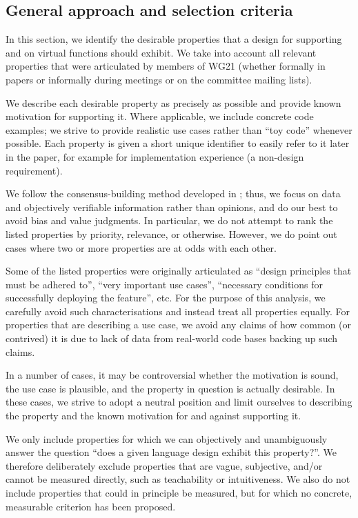 
\subsection{General approach and selection criteria}

In this section, we identify the desirable properties that a design for supporting  and  on virtual functions should exhibit. We take into account all relevant properties that were articulated by members of WG21 (whether formally in papers or informally during meetings or on the committee mailing lists).

We describe each desirable property as precisely as possible and provide known motivation for supporting it. Where applicable, we include concrete code examples; we strive to provide realistic use cases rather than ``toy code'' whenever possible. Each property is given a short unique identifier to easily refer to it later in the paper, for example  for implementation experience (a non-design requirement). 

We follow the consensus-building method developed in \cite{P3684R0}; thus, we focus on data and objectively verifiable information rather than opinions, and do our best to avoid bias and value judgments. In particular, we do not attempt to rank the listed properties by priority, relevance, or otherwise. However, we do point out cases where two or more properties are at odds with each other.

Some of the listed properties were originally articulated as ``design principles that must be adhered to'',  ``very important use cases'', ``necessary conditions for successfully deploying the feature'', etc. For the purpose of this analysis, we carefully avoid such characterisations and instead treat all properties equally. For properties that are describing a use case, we avoid any claims of how common (or contrived) it is due to lack of data from real-world code bases backing up such claims.

In a number of cases, it may be controversial whether the motivation is sound, the use case is plausible, and the property in question is actually desirable. In these cases, we strive to adopt a neutral position and limit ourselves to describing the property and the known motivation for and against supporting it.

We only include properties for which we can objectively and unambiguously answer the question ``does a given language design exhibit this property?''. We therefore deliberately exclude properties that are vague, subjective, and/or cannot be measured directly, such as teachability or intuitiveness. We also do not include properties that could in principle be measured, but for which no concrete, measurable criterion has been proposed.

